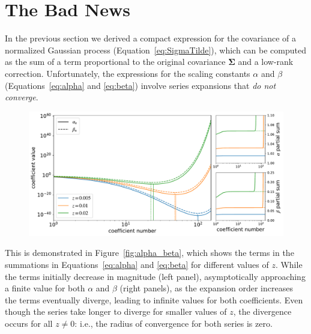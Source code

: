 \documentclass[modern]{aastex62}
\begin{document}
\section{The Bad News}
%
In the previous section we derived a compact expression for
the covariance of a normalized Gaussian process (Equation~\ref{eq:SigmaTilde}),
which can be computed as the sum of a term proportional to the original
covariance $\pmb{\Sigma}$ and a low-rank correction.
%
Unfortunately, the expressions for the scaling constants $\alpha$ and
$\beta$ (Equations~\ref{eq:alpha} and \ref{eq:beta}) involve series
expansions that \emph{do not converge}.
%
\begin{figure}[t!]
    \begin{centering}
        \includegraphics[width=\linewidth]{figures/alpha_beta.pdf}
    \end{centering}
\end{figure}
%
This is demonstrated in Figure~\ref{fig:alpha_beta}, which shows the
terms in the summations in Equations~\ref{eq:alpha} and \ref{eq:beta} for
different values of $z$. While the terms initially decrease in magnitude
(left panel), asymptotically approaching a finite value for both
$\alpha$ and $\beta$ (right panels), as the expansion order increases
the terms eventually diverge, leading to infinite values for both
coefficients. Even though the series take longer to diverge for smaller
values of $z$, the divergence occurs for all $z \ne 0$: i.e., the radius
of convergence for both series is zero.
\end{document}
